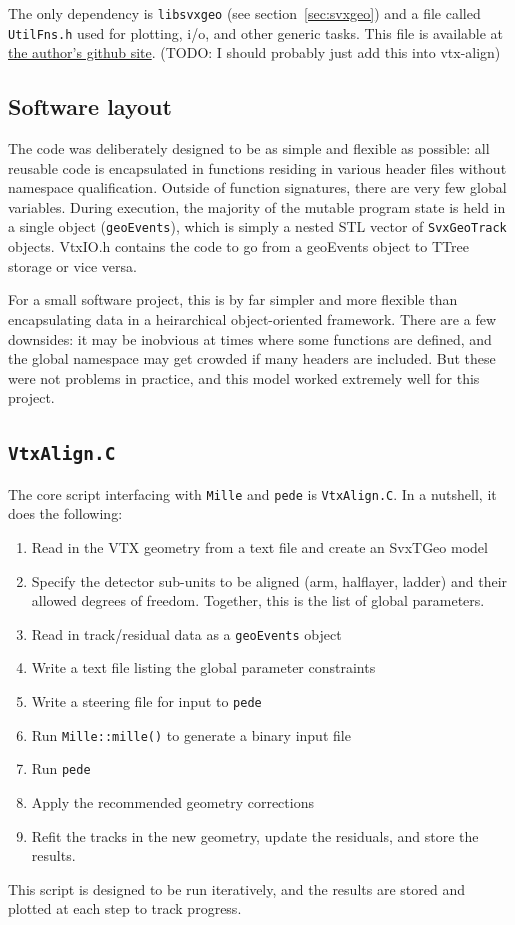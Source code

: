 \documentclass[12pt]{article}
\begin{document}
The only dependency is \texttt{libsvxgeo} (see section~\ref{sec:svxgeo}) and a file called \texttt{UtilFns.h} used for plotting, i/o, and other generic tasks. This file is available at \href{https://github.com/andrewadare/utils.git}{the author's github site}. (TODO: I should probably just add this into vtx-align)

\subsection{Software layout}
The code was deliberately designed to be as simple and flexible as possible: all reusable code is encapsulated in functions residing in various header files without namespace qualification. Outside of function signatures, there are very few global variables. During execution, the majority of the mutable program state is held in a single object (\texttt{geoEvents}), which is simply a nested STL vector of \texttt{SvxGeoTrack} objects. VtxIO.h contains the code to go from a geoEvents object to TTree storage or vice versa.

For a small software project, this is by far simpler and more flexible than encapsulating data in a heirarchical object-oriented framework. There are a few downsides: it may be inobvious at times where some functions are defined, and the global namespace may get crowded if many headers are included. But these were not problems in practice, and this model worked extremely well for this project.

\subsection{\texttt{VtxAlign.C}}
The core script interfacing with \texttt{Mille} and \texttt{pede} is \texttt{VtxAlign.C}. In a nutshell, it does the following:
\begin{enumerate}
  \item Read in the VTX geometry from a text file and create an SvxTGeo model
  \item Specify the detector sub-units to be aligned (arm, halflayer, ladder) and their allowed degrees of freedom. Together, this is the list of global parameters.
  \item Read in track/residual data as a \texttt{geoEvents} object
  \item Write a text file listing the global parameter constraints
  \item Write a steering file for input to \texttt{pede}
  \item Run \texttt{Mille::mille()} to generate a binary input file
  \item Run \texttt{pede}
  \item Apply the recommended geometry corrections
  \item Refit the tracks in the new geometry, update the residuals, and store the results.
\end{enumerate}
This script is designed to be run iteratively, and the results are stored and plotted at each step to track progress.
\end{document}
